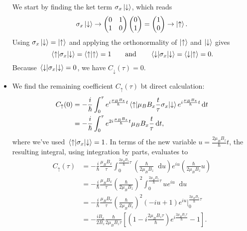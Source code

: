 \documentclass[11pt, a4paper]{article}
\newcommand{\diff}{\mathop{}\!\mathrm{d}} %
\newcommand{\eqtext}[1]{\qquad \text{#1} \qquad}
\newcommand{\ua}{\uparrow}  %
\newcommand{\da}{\downarrow}  %
\begin{document}
\begin{itemize}
	We start by finding the ket term $ \sigma_{x}\ket{\da} $, which reads
	\begin{equation*}
		\sigma_{x}\ket{\da} \to 
		\begin{pmatrix}
		0 & 1\\
		1 & 0
		\end{pmatrix}
		\begin{pmatrix}
		0\\
		1
		\end{pmatrix}
		= 
		\begin{pmatrix}
		1\\
		0
		\end{pmatrix}
		\to \ket{\ua}.
	\end{equation*}
	Using  $ \sigma_{x}\ket{\da} = \ket{\ua} $ and applying the orthonormality of $ \ket{\ua} $ and $ \ket{\da} $ gives
	\begin{equation*}
		\mel{\ua}{\sigma_{x}}{\da} = \braket{\ua}{\ua} = 1 \eqtext{and} \mel{\da}{\sigma_{x}}{\da} = \braket{\da}{\ua} = 0.
	\end{equation*}
	Because $ \mel{\da}{\sigma_{x}}{\da} = 0 $, we have $ C_{\da}(\tau) = 0 $. 
	
	\item We find the remaining coefficient $ C_{\ua}(\tau) $ bt direct calculation:
	\begin{align*}
		C_{\ua}(0) &= - \frac{i}{\hbar}\int_{0}^{\tau} e^{i\frac{\mu_{B}B_{z}}{\hbar}t}\mel{\ua}{\mu_{B}B_{x}\frac{t}{\tau}\sigma_{x}}{\da} e^{i\frac{\mu_{B}B_{z}}{\hbar}t} \diff t\\
		& = - \frac{i}{\hbar}\int_{0}^{\tau} e^{2i\frac{\mu_{B}B_{z}}{\hbar}t} \mu_{B}B_{x}\frac{t}{\tau} \diff t,
	\end{align*}
	where we've used $ \mel{\ua}{\sigma_{x}}{\da} = 1$. In terms of the new variable $ u = \frac{2\mu_{B}B_{z}}{\hbar}t $, the resulting integral, using integration by parts, evaluates to
	\begin{align*}
		C_{\ua}(\tau) &= - \frac{i}{\hbar}\frac{\mu_{B}B_{x}}{\tau} \int_{0}^{ \frac{2\mu_{B}B_{z}}{\hbar}\tau} \left(\frac{\hbar}{2\mu_{B}B_{z}}\diff u\right) e^{iu} \left(\frac{\hbar}{2\mu_{B}B_{z}}u\right) \\
		& = - \frac{i}{\hbar}\frac{\mu_{B}B_{x}}{\tau} \left(\frac{\hbar}{2\mu_{B}B_{z}}\right)^{2} \int_{0}^{ \frac{2\mu_{B}B_{z}}{\hbar}\tau} ue^{iu}\diff u\\
		& = - \frac{i}{\hbar}\frac{\mu_{B}B_{x}}{\tau} \left(\frac{\hbar}{2\mu_{B}B_{z}}\right)^{2}  \left(-iu + 1\right)e^{iu}\Big |_{0}^{\frac{2\mu_{B}B_{z}}{\hbar}\tau}\\
		& = -\frac{iB_{x}}{2B_{z}} \frac{\hbar}{2\mu_{B}B_{z}\tau} \left[\left(1 - i \frac{2\mu_{B}B_{z}\tau}{\hbar}\right)e^{i\frac{2\mu_{B}B_{z}\tau}{\hbar}} - 1\right].
	\end{align*}
	

\end{itemize}
\end{document}
